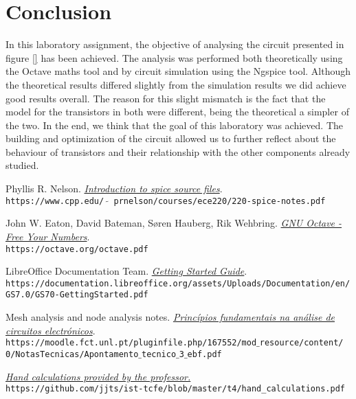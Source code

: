 \clearpage

\section{Conclusion}
\label{sec:conclusion}

In this laboratory assignment, the objective of analysing the circuit presented
in figure \ref{} has been achieved. The analysis was performed both theoretically
using the Octave maths tool and by circuit simulation using the Ngspice tool.
Although the theoretical results differed slightly from the simulation results we did achieve good results overall.
The reason for this slight mismatch is the fact that the model for the transistors
in both were different, being the theoretical a simpler of the two.
In the end, we think that the goal of this laboratory was achieved. The building and optimization
of the circuit allowed us to further reflect about the behaviour of transistors and their relationship with the other components already studied.


\begin{thebibliography}{9}

    Phyllis R. Nelson.
    \textit{\href{https://www.cpp.edu/~prnelson/courses/ece220/220-spice-notes.pdf}{Introduction to \emph{spice} source files}}.
    \\\texttt{https://www.cpp.edu/ $\tilde{}$ prnelson/courses/ece220/220-spice-notes.pdf}


    John W. Eaton, David Bateman, Søren Hauberg, Rik Wehbring.
    \textit{\href{https://octave.org/octave.pdf}{GNU Octave - Free Your Numbers}}.
    \\\texttt{https://octave.org/octave.pdf}

    LibreOffice Documentation Team.
    \textit{\href{https://documentation.libreoffice.org/assets/Uploads/Documentation/en/GS7.0/GS70-GettingStarted.pdf}{Getting Started Guide}}.
    \\\texttt{https://documentation.libreoffice.org/assets/Uploads/Documentation/en/
        GS7.0/GS70-GettingStarted.pdf}

    Mesh analysis and node analysis notes.
    \textit{\href{https://moodle.fct.unl.pt/pluginfile.php/167552/mod_resource/content/0/NotasTecnicas/Apontamento_tecnico_3_ebf.pdf}{Princípios fundamentais na análise de circuitos electrónicos}}.
    \\\texttt{https://moodle.fct.unl.pt/pluginfile.php/167552/mod$\_$resource/content/
        0/NotasTecnicas/Apontamento$\_$tecnico$\_$3$\_$ebf.pdf}

    \textit{\href{https://github.com/jjts/ist-tcfe/blob/master/t4/hand_calculations.pdf}{
            Hand calculations provided by the professor.}}
    \\\texttt{https://github.com/jjts/ist-tcfe/blob/master/t4/hand\_calculations.pdf}
\end{thebibliography}